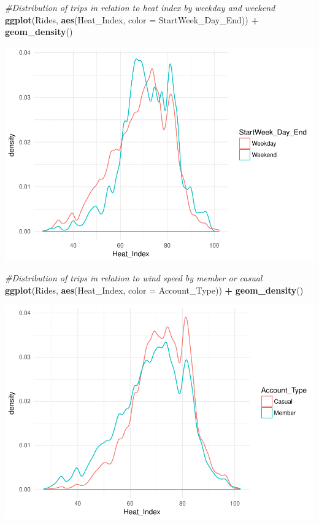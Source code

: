 \documentclass[]{article}
\newenvironment{Shaded}{\begin{snugshade}}{\end{snugshade}}
\newcommand{\KeywordTok}[1]{\textcolor[rgb]{0.13,0.29,0.53}{\textbf{#1}}}
\newcommand{\DataTypeTok}[1]{\textcolor[rgb]{0.13,0.29,0.53}{#1}}
\newcommand{\StringTok}[1]{\textcolor[rgb]{0.31,0.60,0.02}{#1}}
\newcommand{\CommentTok}[1]{\textcolor[rgb]{0.56,0.35,0.01}{\textit{#1}}}
\newcommand{\OperatorTok}[1]{\textcolor[rgb]{0.81,0.36,0.00}{\textbf{#1}}}
\newcommand{\NormalTok}[1]{#1}
\begin{document}
\begin{Shaded}
\begin{Highlighting}[]
\CommentTok{#Distribution of trips in relation to heat index by weekday and weekend}
\KeywordTok{ggplot}\NormalTok{(Rides, }\KeywordTok{aes}\NormalTok{(Heat_Index, }\DataTypeTok{color =}\NormalTok{ StartWeek_Day_End)) }\OperatorTok{+}\StringTok{ }\KeywordTok{geom_density}\NormalTok{()}
\end{Highlighting}
\end{Shaded}

\includegraphics{Nice_Ride_Project_Stat_ReportDRAFT_files/figure-latex/unnamed-chunk-15-1.pdf}

\begin{Shaded}
\begin{Highlighting}[]
\CommentTok{#Distribution of trips in relation to wind speed by member or casual}
\KeywordTok{ggplot}\NormalTok{(Rides, }\KeywordTok{aes}\NormalTok{(Heat_Index, }\DataTypeTok{color =}\NormalTok{ Account_Type)) }\OperatorTok{+}\StringTok{ }\KeywordTok{geom_density}\NormalTok{()}
\end{Highlighting}
\end{Shaded}

\includegraphics{Nice_Ride_Project_Stat_ReportDRAFT_files/figure-latex/unnamed-chunk-15-2.pdf}
\end{document}
